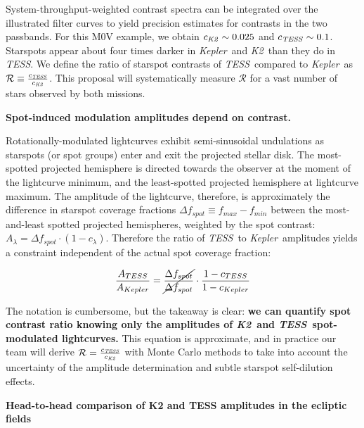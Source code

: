 \documentclass[letterpaper,12pt]{article}
\newcommand{\tess}{{\it TESS}}
\newcommand{\kepler}{{\it Kepler}}
\newcommand{\ktwo}{{\it K2}}
\begin{document}
System-throughput-weighted contrast spectra can be integrated over the illustrated filter curves to yield precision estimates for contrasts in the two passbands.  For this M0V example, we obtain $c_{\ktwo}\sim0.025$ and $c_{\tess}\sim0.1$.  Starspots appear about four times darker in \kepler\ and \ktwo\ than they do in \tess.  We define the ratio of starspot contrasts of \tess\ compared to \kepler\ as $\mathcal{R}\equiv \frac{c_{\tess}}{c_{\ktwo}}$.  This proposal will systematically measure $\mathcal{R}$ for a vast number of stars observed by both missions.
\newline


\noindent \textbf{Spot-induced modulation amplitudes depend on contrast.}  

Rotationally-modulated lightcurves exhibit semi-sinusoidal undulations as starspots (or spot groups) enter and exit the projected stellar disk.  The most-spotted projected hemisphere is directed towards the observer at the moment of the lightcurve minimum, and the least-spotted projected hemisphere at lightcurve maximum.  The amplitude of the lightcurve, therefore, is approximately the difference in starspot coverage fractions $\Delta f_{spot} \equiv f_{max}-f_{min}$ between the most-and-least spotted projected hemispheres, weighted by the spot contrast: $ A_\lambda = \Delta f_{spot} \cdot (1-c_\lambda)$.  Therefore the ratio of \tess\ to \kepler\ amplitudes yields a constraint independent of the actual spot coverage fraction:

$$ \frac{A_{TESS}}{A_{Kepler}} = \cancel{\frac{\Delta f_{spot}}{\Delta f_{spot}}} \cdot \frac{1-c_{TESS}}{1-c_{Kepler}} $$

The notation is cumbersome, but the takeaway is clear: \textbf{we can quantify spot contrast ratio knowing only the amplitudes of \ktwo\ and \tess\ spot-modulated lightcurves.}  This equation is approximate, and in practice our team will derive $\mathcal{R}= \frac{c_{\tess}}{c_{\ktwo}}$ with Monte Carlo methods to take into account the uncertainty of the amplitude determination and subtle starspot self-dilution effects.
\newline

\noindent \textbf{Head-to-head comparison of K2 and TESS amplitudes in the ecliptic fields}
\end{document}
